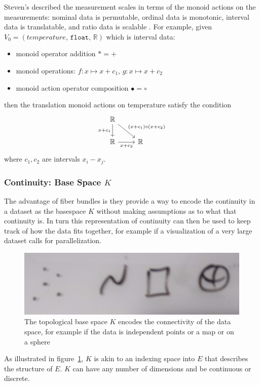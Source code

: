 \documentclass[../main.tex]{subfiles}
\begin{document}
Steven's described the measurement scales\cite{stevensTheoryScalesMeasurement1946,leaFormalizationMeasurementScale} in terms of the monoid actions on the measurements: nominal data is permutable, ordinal data is monotonic, interval data is translatable, and ratio data is scalable \cite{weissteinSimilarityTransformation}. For example, given  $V_0 = (temperature,\, \texttt{float},\, \mathbb{R})$ which is interval data:
\begin{itemize}
    \item monoid operator addition $\ast = +$
    \item monoid operations: $f: x\mapsto x + c_1 $, $g: x\mapsto x + c_2$
    \item monoid action operator composition $\bullet = \circ$
\end{itemize}
then the translation monoid actions on temperature satisfy the condition
\begin{equation}
    \begin{tikzcd}
        \mathbb{R} \arrow[rd, "(x+c_1)\circ(x+c_2)"] \arrow[d, "x+c_1"'] &            \\
        \mathbb{R} \arrow[r, "x+c_2"']                                   & \mathbb{R}
    \end{tikzcd}
\end{equation}
where $c_1, c_2$ are intervals $x_i-x_j$. 


\subsubsection{Continuity: Base Space $K$} 
\label{sec:data_base}
The advantage of fiber bundles is they provide a way to encode the continuity in a dataset as the basespace $K$ without making assumptions as to what that continuity is. In turn this representation of continuity can then be used to keep track of how the data fits together, for example if a visualization of a very large dataset calls for parallelization.  

\begin{figure}[H]
    \includegraphics[width=.5\textwidth]{figures/math/k_different_types.png}
    \caption{The topological base space $K$ encodes the connectivity of the data space, for example if the data is independent points or a map or on a sphere}
    \label{fig:base_space_types}
\end{figure}
As illustrated in figure~\ref{fig:base_space_types}, $K$ is akin to an indexing space into $E$ that describes the structure of $E$.  $K$ can have any number of dimensions and be continuous or discrete. 
\end{document}
